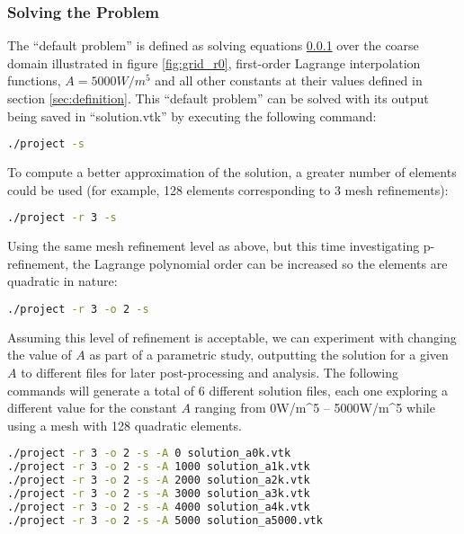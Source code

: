 \documentclass[letterpaper,10pt]{article}
\begin{document}
\subsubsection{Solving the Problem}
The ``default problem'' is defined as solving equations \ref{} over the coarse domain illustrated in figure \ref{fig:grid_r0}, first-order Lagrange interpolation functions, $A=\unit{5000}{W/m^5}$ and all other constants at their values defined in section \ref{sec:definition}. This ``default problem'' can be solved with its output being saved in ``solution.vtk'' by executing the following command:
\vspace{-6mm}
\begin{lstlisting}[numbers=none,frame=none,language=bash]
./project -s
\end{lstlisting}
\vspace{1mm}

To compute a better approximation of the solution, a greater number of elements could be used (for example, 128 elements corresponding to 3 mesh refinements):
\vspace{-6mm}
\begin{lstlisting}[numbers=none,frame=none,language=bash]
./project -r 3 -s
\end{lstlisting}
\vspace{1mm}

Using the same mesh refinement level as above, but this time investigating p-refinement, the Lagrange polynomial order can be increased so the elements are quadratic in nature:
\vspace{-6mm}
\begin{lstlisting}[numbers=none,frame=none,language=bash]
./project -r 3 -o 2 -s
\end{lstlisting}
\vspace{1mm}

Assuming this level of refinement is acceptable, we can experiment with changing the value of $A$ as part of a parametric study, outputting the solution for a given $A$ to different files for later post-processing and analysis. The following commands will generate a total of 6 different solution files, each one exploring a different value for the constant $A$ ranging from \unit{0}{W/m^5} -- \unit{5000}{W/m^5} while using a mesh with 128 quadratic elements.
\vspace{-6mm}
\begin{lstlisting}[numbers=none,frame=none,language=bash]
./project -r 3 -o 2 -s -A 0 solution_a0k.vtk
./project -r 3 -o 2 -s -A 1000 solution_a1k.vtk
./project -r 3 -o 2 -s -A 2000 solution_a2k.vtk
./project -r 3 -o 2 -s -A 3000 solution_a3k.vtk
./project -r 3 -o 2 -s -A 4000 solution_a4k.vtk
./project -r 3 -o 2 -s -A 5000 solution_a5000.vtk
\end{lstlisting}
\vspace{1mm}
\end{document}
